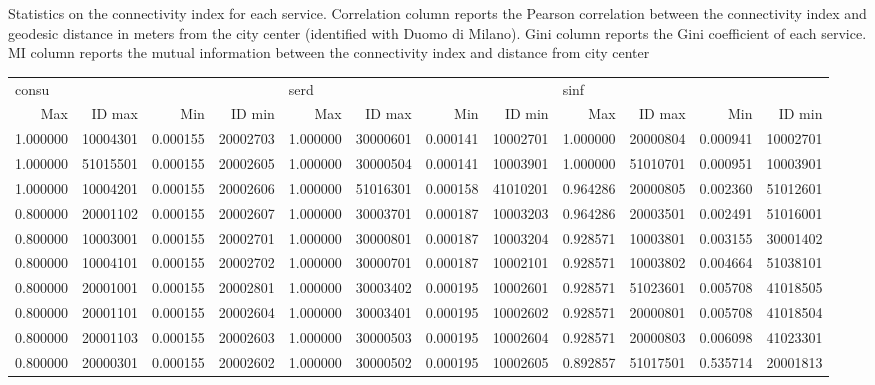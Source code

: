 \documentclass[11pt, titlepage]{article}
\begin{document}
\begin{table}
	\label{statstab}
	\caption{Statistics on the connectivity index for each service. Correlation column reports the Pearson correlation between the connectivity index and geodesic distance in meters from the city center (identified with Duomo di Milano). Gini column reports the Gini coefficient of each service. MI column reports the mutual information between the connectivity index and distance from city center}
\end{table}	

\begin{landscape}
	\scriptsize
	\begin{table}
	\centering
		
	

	\begin{tabular}{rrrrrrrrrrrr}
		\toprule
		\multicolumn{4}{l}{consu} & \multicolumn{4}{l}{serd} & \multicolumn{4}{l}{sinf} \\
		  Max &   ID max &      Min &   ID min &  Max &   ID max &      Min &   ID min &      Max &   ID max &      Min &   ID min \\
		\midrule
		  1.000000 & 10004301 & 0.000155 & 20002703 &  1.000000 & 30000601 & 0.000141 & 10002701 & 1.000000 & 20000804 & 0.000941 & 10002701 \\
		  1.000000 & 51015501 & 0.000155 & 20002605 &  1.000000 & 30000504 & 0.000141 & 10003901 & 1.000000 & 51010701 & 0.000951 & 10003901 \\
		  1.000000 & 10004201 & 0.000155 & 20002606 &  1.000000 & 51016301 & 0.000158 & 41010201 & 0.964286 & 20000805 & 0.002360 & 51012601 \\
		  0.800000 & 20001102 & 0.000155 & 20002607 &  1.000000 & 30003701 & 0.000187 & 10003203 & 0.964286 & 20003501 & 0.002491 & 51016001 \\
		  0.800000 & 10003001 & 0.000155 & 20002701 &  1.000000 & 30000801 & 0.000187 & 10003204 & 0.928571 & 10003801 & 0.003155 & 30001402 \\
		  0.800000 & 10004101 & 0.000155 & 20002702 &  1.000000 & 30000701 & 0.000187 & 10002101 & 0.928571 & 10003802 & 0.004664 & 51038101 \\
		  0.800000 & 20001001 & 0.000155 & 20002801 &  1.000000 & 30003402 & 0.000195 & 10002601 & 0.928571 & 51023601 & 0.005708 & 41018505 \\
		  0.800000 & 20001101 & 0.000155 & 20002604 &  1.000000 & 30003401 & 0.000195 & 10002602 & 0.928571 & 20000801 & 0.005708 & 41018504 \\
		  0.800000 & 20001103 & 0.000155 & 20002603 &  1.000000 & 30000503 & 0.000195 & 10002604 & 0.928571 & 20000803 & 0.006098 & 41023301 \\
		  0.800000 & 20000301 & 0.000155 & 20002602 &  1.000000 & 30000502 & 0.000195 & 10002605 & 0.892857 & 51017501 & 0.535714 & 20001813 \\
		

\end{tabular}
\end{table}
\end{landscape}
\end{document}
